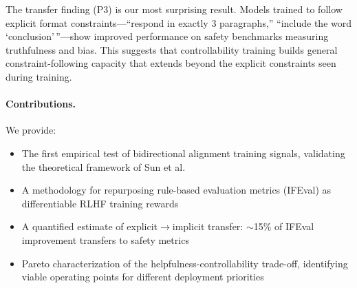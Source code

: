 The transfer finding (P3) is our most surprising result. Models trained to follow explicit format constraints---``respond in exactly 3 paragraphs,'' ``include the word `conclusion'\,''---show improved performance on safety benchmarks measuring truthfulness and bias. This suggests that controllability training builds general constraint-following capacity that extends beyond the explicit constraints seen during training.

\paragraph{Contributions.} We provide:
\begin{itemize}
    \item The first empirical test of bidirectional alignment training signals, validating the theoretical framework of Sun et al. \citep{sun2024bidirectional}
    \item A methodology for repurposing rule-based evaluation metrics (IFEval) as differentiable RLHF training rewards
    \item A quantified estimate of explicit$\to$implicit transfer: $\sim$15\% of IFEval improvement transfers to safety metrics
    \item Pareto characterization of the helpfulness-controllability trade-off, identifying viable operating points for different deployment priorities
\end{itemize}
